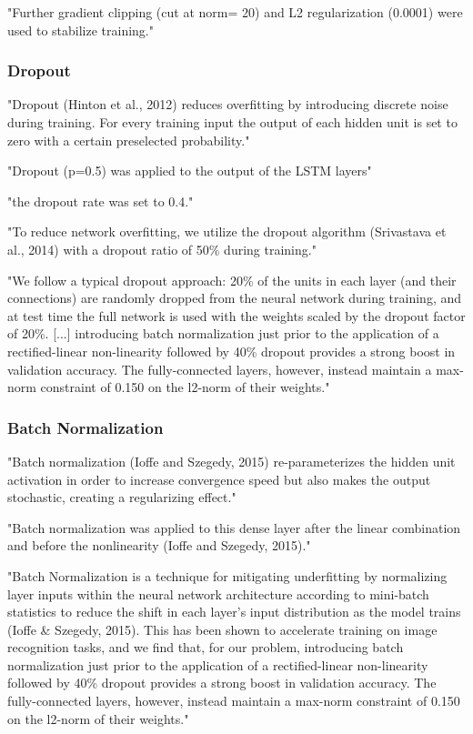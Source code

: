 \documentclass[]{scrartcl}
\begin{document}
"Further gradient clipping (cut at norm= 20) and L2 regularization (0.0001) were used to stabilize training." \cite{Jurtz2017}
\subsubsection{Dropout}
"Dropout (Hinton et al., 2012) reduces overfitting by introducing discrete noise during training. For every training input the output of each hidden unit is set to zero with a certain preselected probability." \cite{Jurtz2017}

"Dropout (p=0.5) was applied to the output of the LSTM layers" \cite{Jurtz2017}

"the dropout rate was set to 0.4." \cite{Fang2017}

"To reduce network overfitting, we utilize the dropout algorithm (Srivastava et al., 2014) with a dropout ratio of 50\% during training." \cite{Heffernan2017}

"We follow a typical dropout approach: 20\% of the units in each layer (and their connections) are randomly dropped from the neural network during training, and at test time the full network is used with the weights scaled by the dropout factor of 20\%. [...] introducing batch normalization just prior to the application of a rectified-linear non-linearity followed by 40\% dropout provides a strong boost in validation accuracy. The fully-connected layers, however, instead maintain a max-norm constraint of 0.150 on the l2-norm of their weights." \cite{Busia2017}
\subsubsection{Batch Normalization}
"Batch normalization (Ioffe and Szegedy, 2015) re-parameterizes the hidden unit activation in order to increase convergence speed but also makes the output stochastic, creating a regularizing effect." \cite{Jurtz2017}

"Batch normalization was applied to this dense layer after the linear combination and before the nonlinearity (Ioffe and Szegedy, 2015)." \cite{Jurtz2017}

"Batch Normalization is a technique for mitigating underfitting by normalizing layer inputs within the neural network architecture according to mini-batch statistics to reduce the shift in each layer’s input distribution as the model trains (Ioffe \& Szegedy, 2015). This has been shown to accelerate training on image recognition tasks, and we find that, for our problem, introducing batch normalization just prior to the application of a rectified-linear non-linearity followed by 40\% dropout provides a strong boost in validation accuracy. The fully-connected layers, however, instead maintain a max-norm constraint of 0.150 on the l2-norm of their weights." \cite{Busia2017}
\end{document}
